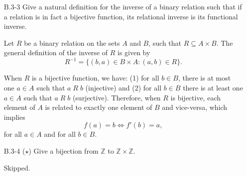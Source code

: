 \documentclass{report}
\makeatletter
\renewenvironment{framed}{%
 \def\FrameCommand##1{\hskip\@totalleftmargin
 \fboxsep=\FrameSep\fbox{##1}}%
 \MakeFramed {\advance\hsize-\width
   \@totalleftmargin\z@ \linewidth\hsize
   \@setminipage}}%
 {\par\unskip\endMakeFramed}
\makeatother
\begin{document}
\begin{enumerate}
\item[B.3{-}3]{Give a natural definition for the inverse of a binary relation
such that if a relation is in fact a bijective function, its relational inverse
is its functional inverse.}

\begin{framed}
Let $R$ be a binary relation on the sets $A$ and $B$, such that
$R \subseteq A \times B$. The general definition of the inverse of $R$ is given
by
\[
  R^{-1} = \{(b, a) \in B \times A : (a, b) \in R\}.
\]

When $R$ is a bijective function, we have: (1) for all $b \in B$, there
is at most one $a \in A$ such that $a\;R\;b$ (injective) and (2) for all
$b \in B$ there is at least one $a \in A$ such that $a\;R\;b$ (surjective).
Therefore, when $R$ is bijective, each element of $A$ is related to exactly
one element of $B$ and vice-versa, which implies
\[
  f(a) = b \iff f'(b) = a,
\]
for all $a \in A$ and for all $b \in B$.
\end{framed}

\item[B.3{-}4]{($\star$) Give a bijection from $\mathbb{Z}$ to
$\mathbb{Z} \times \mathbb{Z}$.}

\begin{framed}
Skipped.
\end{framed}

\end{enumerate}
\end{document}
